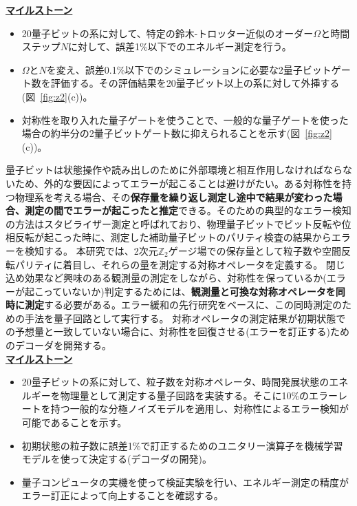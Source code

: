 \documentclass[11pt,a4j,dvipdfmx]{jarticle} 					%
\newcommand{\研究課題名}{誤り耐性量子コンピュータに向けた誤り訂正技術の開発(仮)}
\newcommand{\研究機関名}{東京大学}
\newcommand{\研究代表者氏名}{寺師弘二}
\newcommand{\研究期間の最終元号年度}{10}  %
\newcommand{\mybf}[1]{{\bfseries\sffamily#1}}
\newcommand{\marutwo}{\raise0.2mm\hbox{\textcircled{\scriptsize{2}}}}
\begin{document}
\underline{\bf マイルストーン}\vspace{-2mm}
\begin{itemize}
\item 20量子ビットの系に対して、特定の鈴木-トロッター近似のオーダー$\Omega$と時間ステップ$N$に対して、誤差1\%以下でのエネルギー測定を行う。\vspace{-2mm}
\item $\Omega$と$N$を変え、誤差0.1\%以下でのシミュレーションに必要な2量子ビットゲート数を評価する。その評価結果を20量子ビット以上の系に対して外挿する(図~\ref{fig:z2}(c))。\vspace{-2mm}
\item 対称性を取り入れた量子ゲートを使うことで、一般的な量子ゲートを使った場合の約半分の2量子ビットゲート数に抑えられることを示す(図~\ref{fig:z2}(c))。
\end{itemize}





\noindent \mybf{\ul{\marutwo\ 対称性を用いたエラー訂正手法の開発}}

量子ビットは状態操作や読み出しのために外部環境と相互作用しなければならないため、外的な要因によってエラーが起こることは避けがたい。ある対称性を持つ物理系を考える場合、その\mybf{保存量を繰り返し測定し途中で結果が変わった場合、測定の間でエラーが起こったと推定}できる。そのための典型的なエラー検知の方法はスタビライザー測定と呼ばれており、物理量子ビットでビット反転や位相反転が起こった時に、測定した補助量子ビットのパリティ検査の結果からエラーを検知する。
本研究では、2次元$\mathbb{Z}_2$ゲージ場での保存量として粒子数や空間反転パリティに着目し、それらの量を測定する対称オペレータを定義する。
閉じ込め効果など興味のある観測量の測定をしながら、対称性を保っているか(エラーが起こっていないか)判定するためには、\mybf{観測量と可換な対称オペレータを同時に測定}する必要がある。エラー緩和の先行研究をベースに、この同時測定のための手法を量子回路として実行する。
対称オペレータの測定結果が初期状態での予想量と一致していない場合に、対称性を回復させる(エラーを訂正する)ためのデコーダを開発する。\vspace{-4mm}\\

\underline{\bf マイルストーン}\vspace{-2mm}
\begin{itemize}
\item 20量子ビットの系に対して、粒子数を対称オペレータ、時間発展状態のエネルギーを物理量として測定する量子回路を実装する。そこに10\%のエラーレートを持つ一般的な分極ノイズモデルを適用し、対称性によるエラー検知が可能であることを示す。\vspace{-2mm}
\item 初期状態の粒子数に誤差1\%で訂正するためのユニタリー演算子を機械学習モデルを使って決定する(デコーダの開発)。\vspace{-2mm}
\item 量子コンピュータの実機を使って検証実験を行い、エネルギー測定の精度がエラー訂正によって向上することを確認する。
\end{itemize}
\end{document}
